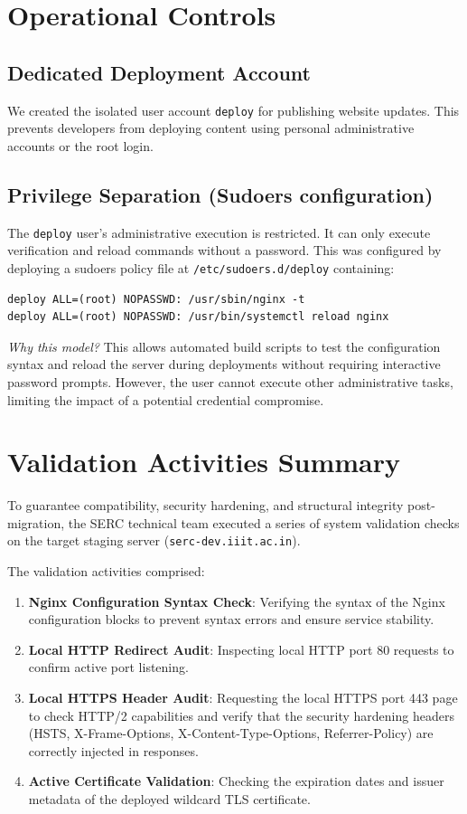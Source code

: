 \documentclass[11pt,a4paper,DIV=16,headings=normal,parskip=half]{scrartcl}
\begin{document}
\section{Operational Controls}

\subsection{Dedicated Deployment Account}
We created the isolated user account \texttt{deploy} for publishing website updates. This prevents developers from deploying content using personal administrative accounts or the root login.

\subsection{Privilege Separation (Sudoers configuration)}
The \texttt{deploy} user's administrative execution is restricted. It can only execute verification and reload commands without a password. This was configured by deploying a sudoers policy file at \texttt{/etc/sudoers.d/deploy} containing:
\begin{lstlisting}
deploy ALL=(root) NOPASSWD: /usr/sbin/nginx -t
deploy ALL=(root) NOPASSWD: /usr/bin/systemctl reload nginx
\end{lstlisting}
\textit{Why this model?} This allows automated build scripts to test the configuration syntax and reload the server during deployments without requiring interactive password prompts. However, the user cannot execute other administrative tasks, limiting the impact of a potential credential compromise.

\section{Validation Activities Summary}
\label{sec:validation_activities}

To guarantee compatibility, security hardening, and structural integrity post-migration, the SERC technical team executed a series of system validation checks on the target staging server (\texttt{serc-dev.iiit.ac.in}). 

The validation activities comprised:
\begin{enumerate}
    \item \textbf{Nginx Configuration Syntax Check}: Verifying the syntax of the Nginx configuration blocks to prevent syntax errors and ensure service stability.
    \item \textbf{Local HTTP Redirect Audit}: Inspecting local HTTP port 80 requests to confirm active port listening.
    \item \textbf{Local HTTPS Header Audit}: Requesting the local HTTPS port 443 page to check HTTP/2 capabilities and verify that the security hardening headers (HSTS, X-Frame-Options, X-Content-Type-Options, Referrer-Policy) are correctly injected in responses.
    \item \textbf{Active Certificate Validation}: Checking the expiration dates and issuer metadata of the deployed wildcard TLS certificate.
\end{enumerate}
\end{document}
